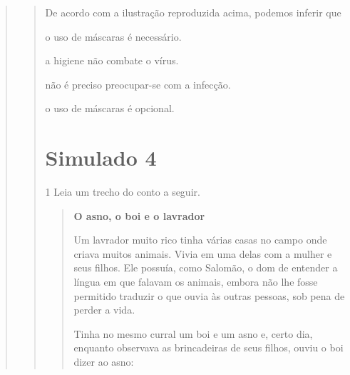 \begin{escolha}
\begin{escolha}
\begin{escolha}
\begin{quote}
\begin{quote}
{

De acordo com a ilustração reproduzida acima, podemos inferir que

\begin{escolha}
  \item o uso de máscaras é necessário.

  \item a higiene não combate o vírus.

  \item não é preciso preocupar-se com a infecção.

  \item o uso de máscaras é opcional.
\end{escolha}


\chapter{Simulado 4}

\num{1} Leia um trecho do conto a seguir.

\begin{quote}
\textbf{O asno, o boi e o lavrador}

Um lavrador muito rico tinha várias casas no campo onde criava muitos
animais. Vivia em uma delas com a mulher e seus filhos. Ele possuía,
como Salomão, o dom de entender a língua em que falavam os animais,
embora não lhe fosse permitido traduzir o que ouvia às outras pessoas,
sob pena de perder a vida.

Tinha no mesmo curral um boi e um asno e, certo dia, enquanto observava
as brincadeiras de seus filhos, ouviu o boi dizer ao asno:


\end{quote}}
\end{quote}
\end{quote}
\end{escolha}
\end{escolha}
\end{escolha}
